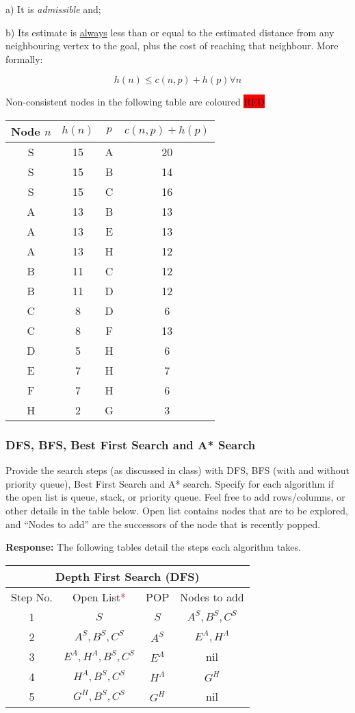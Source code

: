 \documentclass[12pt, letterpaper]{article}
\newcommand{\mybox}[1]{\par\noindent\colorbox{shadecolor}
{\parbox{\dimexpr\textwidth-2\fboxsep\relax}{#1}}}
\begin{document}
a) It is \textit{admissible} and;

b) Its estimate is \underline{always} less than or equal to the estimated distance from any neighbouring vertex to the goal, plus the cost of reaching that neighbour. More formally:

\[h(n) \leq c(n,p) + h(p) \forall n\]

Non-consistent nodes in the following table are coloured \colorbox{red}{RED}

\begin{center}
    \begin{tabular}{|c|c|c|c|} 
    \hline
    Node $n$ & $h(n)$ & $p$ & $c(n,p)+h(p)$ \tabularnewline
    \hline
    S & 15 & A & 20\tabularnewline
    \hline
    \rowcolor{red}S & 15 & B & 14\tabularnewline
    \hline
    S & 15 & C & 16\tabularnewline
    \hline
    A & 13 & B & 13\tabularnewline
    \hline
    A & 13 & E & 13\tabularnewline
    \hline
    \rowcolor{red}A & 13 & H & 12\tabularnewline
    \hline
    B & 11 & C & 12\tabularnewline
    \hline
    B & 11 & D & 12\tabularnewline
    \hline
    \rowcolor{red}C & 8 & D & 6\tabularnewline
    \hline
    C & 8 & F & 13\tabularnewline
    \hline
    D & 5 & H & 6\tabularnewline
    \hline
    E & 7 & H & 7\tabularnewline
    \hline
    \rowcolor{red}F & 7 & H & 6\tabularnewline
    \hline
    H & 2 & G & 3\tabularnewline
    \hline

    \end{tabular}
\end{center}

\subsubsection{DFS, BFS, Best First Search and A* Search}
\mybox{Provide the search steps (as discussed in class) with DFS, BFS (with and without priority
queue), Best First Search and A* search. Specify for each algorithm if the open list is
queue, stack, or priority queue. Feel free to add rows/columns, or other details in the
table below. Open list contains nodes that are to be explored, and “Nodes to add” are
the successors of the node that is recently popped.}

\textbf{Response:} The following tables detail the steps each algorithm takes.

\begin{center}
    \begin{tabular}{|c|c|c|c|}
    \hline
    \multicolumn{4}{|c|}{Depth First Search (\textbf{DFS})}\\
    \hline
    Step No. & Open List\textcolor{red}{*} & POP & Nodes to add \\ 
    \hline
    1 & $S$ & $S$ & $A^S, B^S, C^S$ \\
    \hline
    2 & $A^S, B^S, C^S$ & $A^S$ & $E^A,H^A$ \\
    \hline
    3 & $E^A, H^A, B^S, C^S$ & $E^A$ & nil \\
    \hline
    4 & $H^A, B^S, C^S$ & $H^A$ & $G^H$ \\
    \hline
    5 & $G^H,B^S,C^S$ & $G^H$ & nil \\
    \hline
    \end{tabular}
\end{center}
\end{document}
